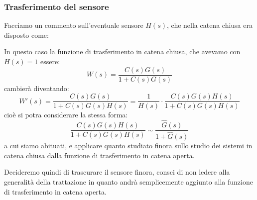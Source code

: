 \documentclass[a4paper,11pt]{article}
\begin{document}
\subsubsection{Trasferimento del sensore}
Facciamo un commento sull'eventuale sensore $H(s)$, che nella catena chiusa era disposto come:

\begin{center}
\end{center}

In questo caso la funzione di trasferimento in catena chiusa, che avevamo con $H(s) = 1$ essere:
$$
W(s) = \frac{C(s) G(s)}{1 + C(s) G(s)}
$$
cambierà diventando:
$$
W'(s) = \frac{C(s) G(s)}{1 + C(s) G(s) H(s)} = \frac{1}{H(s)} \cdot \frac{C(s) G(s) H(s)}{1 + C(s) G(s) H(s)}
$$
cioè si potra considerare la stessa forma:
$$
\frac{C(s) G(s) H(s)}{1 + C(s) G(s) H(s)} \sim \frac{\hat{G}(s)}{1 + \hat{G}(s)}
$$
a cui siamo abituati, e applicare quanto studiato finora sullo studio dei sistemi in catena chiusa dalla funzione di trasferimento in catena aperta.

Decideremo quindi di trascurare il sensore finora, consci di non ledere alla generalità della trattazione in quanto andrà semplicemente aggiunto alla funzione di trasferimento in catena aperta.
\end{document}
